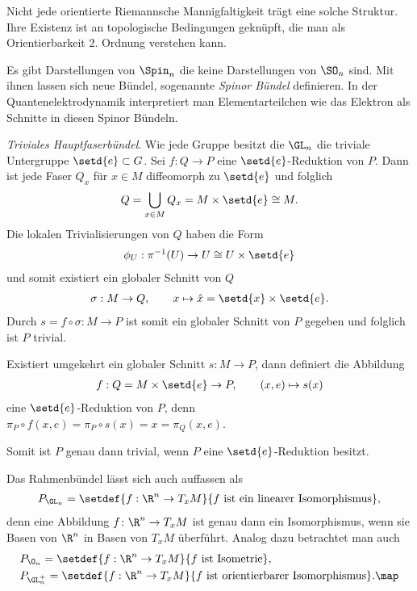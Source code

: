 \documentclass[%
	paper=a5,%
	fleqn,%
	DIV=18,%
	BCOR=0mm,
	fontsize=11pt,
	titlepage=false,%
	bibliography=totoc,
	DIV=18,%
	twoside=true,
	pdftitle=Riemannsche Geometrie,
	pdfauthor=Uwe Semmelmann,
	numbers=noendperiod]%
	{scrbook}
\begin{document}
\begin{ex}
\begin{exenum}
Nicht jede orientierte Riemannsche Mannigfaltigkeit trägt eine solche
Struktur. Ihre Existenz ist an topologische Bedingungen geknüpft, die man
als Orientierbarkeit 2. Ordnung verstehen kann.

Es gibt Darstellungen von $\Spin_n$ die keine Darstellungen von $\SO_n$ sind.
Mit ihnen lassen sich neue Bündel, sogenannte \emph{Spinor Bündel} definieren.
In der Quantenelektrodynamik interpretiert man Elementarteilchen wie das
Elektron als Schnitte in diesen Spinor Bündeln.
\item \textit{Triviales Hauptfaserbündel}.
Wie jede Gruppe besitzt die $\GL_n$ die triviale Untergruppe
$\setd{e}\subset G$. Sei $f\colon Q\to P$ eine $\setd{e}$-Reduktion von $P$. Dann
ist jede Faser $Q_x$ für $x\in M$ diffeomorph zu $\setd{e}$ und folglich
\begin{align*}
Q = \bigcup_{x\in M} Q_x = M\times \setd{e}\cong M. 
\end{align*} 
Die lokalen Trivialisierungen von $Q$ haben die Form
\begin{align*}
\phi_U : \pi^{-1}(U) \to U\cong U\times\setd{e}
\end{align*}
und somit existiert ein globaler Schnitt von $Q$
\begin{align*}
\sigma : M\to Q,\qquad x\mapsto \hat{x} = \setd{x}\times\setd{e}.
\end{align*}
Durch $s = f\circ \sigma\colon M\to P$ ist somit ein globaler Schnitt von $P$ gegeben
und folglich ist $P$ trivial.

Existiert umgekehrt ein globaler Schnitt $s\colon M\to P$, dann definiert die
Abbildung
\begin{align*}
f: Q=M\times\setd{e}\to P,\qquad (x,e)\mapsto s(x)
\end{align*}
eine $\setd{e}$-Reduktion von $P$, denn $\pi_P\circ f(x,e) = \pi_P\circ s(x) = x
= \pi_Q(x,e)$.

Somit ist $P$ genau dann trivial, wenn $P$ eine $\setd{e}$-Reduktion
besitzt.\boxc
\end{exenum}
\end{ex}

\begin{rem}
Das Rahmenbündel lässt sich auch auffassen als
\begin{align*}
P_{\GL_n} = \setdef{f: \R^n\to T_x M}{f \text{ ist ein linearer Isomorphismus}},
\end{align*}
denn eine Abbildung $f\colon \R^n\to T_xM$ ist genau dann ein Isomorphismus, wenn sie
Basen von $\R^n$ in Basen von $T_xM$ überführt.
Analog dazu betrachtet man auch
\begin{align*}
&P_{\O_n} = \setdef{f: \R^n\to T_x M}{f\text{ ist Isometrie}},\\
&P_{\GL_n^+} = \setdef{f: \R^n\to T_x M}{f\text{ ist orientierbarer
Isomorphismus}}.\map
\end{align*} 
\end{rem}
\end{document}
